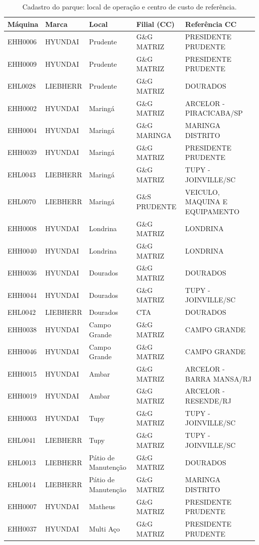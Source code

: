 \begin{table}[H]
\centering
\scriptsize
\begin{tabular}{lllll}
\toprule
Máquina & Marca & Local & Filial (CC) & Referência CC \\
\midrule
EHH0006 & HYUNDAI & Prudente & G\&G MATRIZ & PRESIDENTE PRUDENTE \\
EHH0009 & HYUNDAI & Prudente & G\&G MATRIZ & PRESIDENTE PRUDENTE \\
EHL0028 & LIEBHERR & Prudente & G\&G MATRIZ & DOURADOS \\
EHH0002 & HYUNDAI & Maringá & G\&G MATRIZ & ARCELOR - PIRACICABA/SP \\
EHH0004 & HYUNDAI & Maringá & G\&G MARINGA & MARINGA DISTRITO \\
EHH0039 & HYUNDAI & Maringá & G\&G MATRIZ & PRESIDENTE PRUDENTE \\
EHL0043 & LIEBHERR & Maringá & G\&G MATRIZ & TUPY - JOINVILLE/SC \\
EHL0070 & LIEBHERR & Maringá & G\&S PRUDENTE & VEICULO, MAQUINA E EQUIPAMENTO \\
EHH0008 & HYUNDAI & Londrina & G\&G MATRIZ & LONDRINA \\
EHH0040 & HYUNDAI & Londrina & G\&G MATRIZ & LONDRINA \\
EHH0036 & HYUNDAI & Dourados & G\&G MATRIZ & DOURADOS \\
EHH0044 & HYUNDAI & Dourados & G\&G MATRIZ & TUPY - JOINVILLE/SC \\
EHL0042 & LIEBHERR & Dourados & CTA & DOURADOS \\
EHH0038 & HYUNDAI & Campo Grande & G\&G MATRIZ & CAMPO GRANDE \\
EHH0046 & HYUNDAI & Campo Grande & G\&G MATRIZ & CAMPO GRANDE \\
EHH0015 & HYUNDAI & Ambar & G\&G MATRIZ & ARCELOR - BARRA MANSA/RJ \\
EHH0019 & HYUNDAI & Ambar & G\&G MATRIZ & ARCELOR - RESENDE/RJ \\
EHH0003 & HYUNDAI & Tupy & G\&G MATRIZ & TUPY - JOINVILLE/SC \\
EHL0041 & LIEBHERR & Tupy & G\&G MATRIZ & TUPY - JOINVILLE/SC \\
EHL0013 & LIEBHERR & Pátio de Manutenção & G\&G MATRIZ & DOURADOS \\
EHL0014 & LIEBHERR & Pátio de Manutenção & G\&G MATRIZ & MARINGA DISTRITO \\
EHH0007 & HYUNDAI & Matheus & G\&G MATRIZ & PRESIDENTE PRUDENTE \\
EHH0037 & HYUNDAI & Multi Aço & G\&G MATRIZ & PRESIDENTE PRUDENTE \\
\bottomrule
\end{tabular}
\caption{Cadastro do parque: local de operação e centro de custo de referência.}
\end{table}
